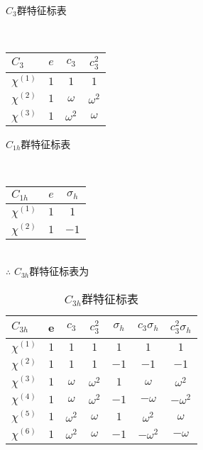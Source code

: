 \documentclass[12pt]{article}
\numberwithin{equation}{section}	 %
\begin{document}
\begin{spacing}{1.5}
\begin{minipage}{\textwidth}
\begin{minipage}[t]{0.5\textwidth}
	\centering
	\makeatletter{}\makeatother\caption{$C_{3}$群特征标表}
	~\\
	\begin{tabular*}{3.5cm}{l|ccc}  %
		$C_{3}$ & $e$ & $c_{3}$ & $c_{3}^{2}$\\  
		\hline  
		$\chi^{(1)}$ & $1$  & $1$ & $1$ \\  
		$\chi^{(2)}$ & $1$  & $\omega$ & $\omega^{2}$ \\ 
		$\chi^{(3)}$ & $1$ & $\omega^{2}$ & $\omega$ \\ 
	\end{tabular*}
	\end{minipage}
	\begin{minipage}[t]{0.5\textwidth}
	\centering
	\makeatletter{}\makeatother\caption{$C_{1h}$群特征标表}
	~\\
	\begin{tabular*}{2.5cm}{l|cc}  %
		$C_{1h}$ & $e$ & $\sigma_{h}$ \\  
		\hline  
		$\chi^{(1)}$ & $1$  & $1$ \\  
		$\chi^{(2)}$ & $1$  & $-1$ \\ 
	\end{tabular*}
	\end{minipage}
\end{minipage}
~\\
$\therefore$ $C_{3h}$群特征标表为 \\
\begin{longtable}{l|cccccc}
\caption{$C_{3h}$群特征标表}\\
	$C_{3h}$ & e & $c_{3}$ & $c_{3}^{2}$ & $\sigma_{h}$ & $c_{3}\sigma_{h}$ & $c_{3}^{2}\sigma_{h}$ \\
	\hline
	$\chi^{(1)}$ & $1$ & $1$ & $1$ & $1$ & $1$ & $1$ \\
	$\chi^{(2)}$ & $1$ & $1$ & $1$ & $-1$ & $-1$ & $-1$ \\
	$\chi^{(3)}$ & $1$ & $\omega$ & $\omega^{2}$ & $1$ & $\omega$ & $\omega^{2}$ \\
	$\chi^{(4)}$ & $1$ & $\omega$ & $\omega^{2}$ & $-1$ & $-\omega$ & $-\omega^{2}$ \\
	$\chi^{(5)}$ & $1$ & $\omega^{2}$ & $\omega$ & $1$ & $\omega^{2}$ & $\omega$ \\
	$\chi^{(6)}$ & $1$ & $\omega^{2}$ & $\omega$ & $-1$ & $-\omega^{2}$ & $-\omega$ \\
\end{longtable}
~\\

\end{spacing}
\end{document}
